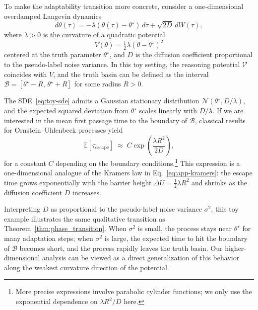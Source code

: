 \documentclass{article}
\theoremstyle{plain}
\theoremstyle{definition}
\theoremstyle{remark}
\newcommand{\E}{\mathbb{E}}
\newcommand{\Lyap}{\mathcal{V}}            %
\newcommand{\Time}{\tau}                   %
\begin{document}
To make the adaptability transition more concrete, consider a one-dimensional overdamped Langevin dynamics
\begin{equation}
    d\theta(\Time)
    =
    - \lambda (\theta(\Time) - \theta^\star)\, d\Time
    +
    \sqrt{2D}\, dW(\Time),
    \label{eq:toy-sde}
\end{equation}
where $\lambda>0$ is the curvature of a quadratic potential
\[
    V(\theta) = \tfrac{1}{2}\lambda (\theta-\theta^\star)^2
\]
centered at the truth parameter $\theta^\star$, and $D$ is the diffusion coefficient proportional to the pseudo-label noise variance. In this toy setting, the reasoning potential $\Lyap$ coincides with $V$, and the truth basin can be defined as the interval $\mathcal{B} = [\theta^\star - R,\, \theta^\star + R]$ for some radius $R>0$.

The SDE~\eqref{eq:toy-sde} admits a Gaussian stationary distribution $\mathcal{N}(\theta^\star, D/\lambda)$, and the expected squared deviation from $\theta^\star$ scales linearly with $D/\lambda$. If we are interested in the mean first passage time to the boundary of $\mathcal{B}$, classical results for Ornstein–Uhlenbeck processes yield \cite{oksendal2003stochastic,strogatz2018}
\[
    \E[\tau_{\mathrm{escape}}]
    \;\approx\;
    C
    \exp\!\left(\frac{\lambda R^2}{2D}\right),
\]
for a constant $C$ depending on the boundary conditions.\footnote{More precise expressions involve parabolic cylinder functions; we only use the exponential dependence on $\lambda R^2 / D$ here.} This expression is a one-dimensional analogue of the Kramers law in Eq.~\eqref{eq:app-kramers}: the escape time grows exponentially with the barrier height $\Delta U = \tfrac{1}{2}\lambda R^2$ and shrinks as the diffusion coefficient $D$ increases.

Interpreting $D$ as proportional to the pseudo-label noise variance $\sigma^2$, this toy example illustrates the same qualitative transition as Theorem~\ref{thm:phase_transition}. When $\sigma^2$ is small, the process stays near $\theta^\star$ for many adaptation steps; when $\sigma^2$ is large, the expected time to hit the boundary of $\mathcal{B}$ becomes short, and the process rapidly leaves the truth basin. Our higher-dimensional analysis can be viewed as a direct generalization of this behavior along the weakest curvature direction of the potential.


\end{document}

